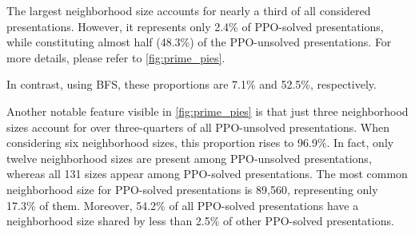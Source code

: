 The largest neighborhood size accounts for nearly a third of all considered presentations.
However, it represents only 2.4\% of PPO-solved presentations, while constituting almost half (48.3\%) of the PPO-unsolved presentations.
For more details, please refer to \cref{fig:prime_pies}.

In contrast, using BFS, these proportions are 7.1\% and 52.5\%, respectively.

Another notable feature visible in \cref{fig:prime_pies} is that just three neighborhood sizes account for over three-quarters of all PPO-unsolved presentations.
When considering six neighborhood sizes, this proportion rises to 96.9\%.
In fact, only twelve neighborhood sizes are present among PPO-unsolved presentations, whereas all 131 sizes appear among PPO-solved presentations.
The most common neighborhood size for PPO-solved presentations is 89,560, representing only 17.3\% of them.
Moreover, 54.2\% of all PPO-solved presentations have a neighborhood size shared by less than 2.5\% of other PPO-solved presentations.

